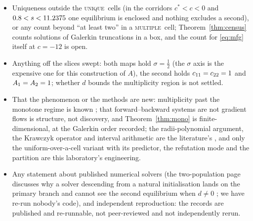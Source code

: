 \documentclass[11pt]{article}
\theoremstyle{definition}
\newcommand{\MULT}{\textup{\textsc{multiple}}}
\newcommand{\UNIQ}{\textup{\textsc{unique}}}
\newcommand{\cstar}{c^{*}}
\begin{document}
\begin{itemize}\setlength{\itemsep}{1pt}
\item Uniqueness outside the \UNIQ\ cells (in the corridors $\cstar<c<0$ and $0.8<s<11.2375$ one equilibrium is enclosed and nothing excludes a second), or any count beyond ``at least two'' in a \MULT\ cell; Theorem~\ref{thm:census} counts solutions of Galerkin truncations in a box, and the count for \eqref{eq:mfg} itself at $c=-12$ is open.
\item Anything off the slices swept: both maps hold $\sigma=\tfrac12$ (the $\sigma$ axis is the expensive one for this construction of $A$), the second holds $c_{11}=c_{22}=1$ and $A_1=A_2=1$; whether $d$ bounds the multiplicity region is not settled.
\item That the phenomenon or the methods are new: multiplicity past the monotone regime is known \cite{Ci15,CV17,BF19,CDFP19}; that forward--backward systems are not gradient flows is structure, not discovery, and Theorem~\ref{thm:mono} is finite-dimensional, at the Galerkin order recorded; the radii-polynomial argument, the Krawczyk operator and interval arithmetic are the literature's \cite{DLM07,vdBL15,Kr69,Mo77,Ru10,Tu11}, and only the uniform-over-a-cell variant with its predictor, the refutation mode and the partition are this laboratory's engineering.
\item Any statement about published numerical solvers (the two-population page discusses why a solver descending from a natural initialisation lands on the primary branch and cannot see the second equilibrium when $d\ne0$ \cite{TwoPopPage}; we have re-run nobody's code), and independent reproduction: the records are published and re-runnable, not peer-reviewed and not independently rerun.
\end{itemize}
\end{document}
